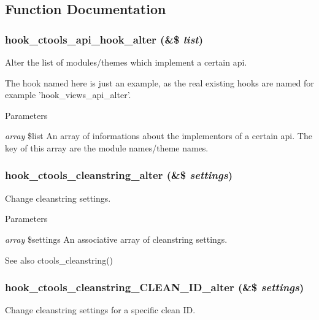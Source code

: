 \subsection{Function Documentation}
\hypertarget{group__hooks_gad31fa7973a09a182d52fc1bda3bd95a0}{
\subsubsection[{hook\_\-ctools\_\-api\_\-hook\_\-alter}]{\setlength{\rightskip}{0pt plus 5cm}hook\_\-ctools\_\-api\_\-hook\_\-alter (\&\$ {\em list})}}
\label{group__hooks_gad31fa7973a09a182d52fc1bda3bd95a0}
Alter the list of modules/themes which implement a certain api.

The hook named here is just an example, as the real existing hooks are named for example 'hook\_\-views\_\-api\_\-alter'.


\begin{DoxyParams}{Parameters}
\item[{\em array}]\$list An array of informations about the implementors of a certain api. The key of this array are the module names/theme names. \end{DoxyParams}
\hypertarget{group__hooks_ga8904abb33205b8553b560e08fd005e3a}{
\subsubsection[{hook\_\-ctools\_\-cleanstring\_\-alter}]{\setlength{\rightskip}{0pt plus 5cm}hook\_\-ctools\_\-cleanstring\_\-alter (\&\$ {\em settings})}}
\label{group__hooks_ga8904abb33205b8553b560e08fd005e3a}
Change cleanstring settings.


\begin{DoxyParams}{Parameters}
\item[{\em array}]\$settings An associative array of cleanstring settings.\end{DoxyParams}
\begin{DoxySeeAlso}{See also}
ctools\_\-cleanstring() 
\end{DoxySeeAlso}
\hypertarget{group__hooks_gaa77de664d1ef915311e4f768eb6c62ea}{
\subsubsection[{hook\_\-ctools\_\-cleanstring\_\-CLEAN\_\-ID\_\-alter}]{\setlength{\rightskip}{0pt plus 5cm}hook\_\-ctools\_\-cleanstring\_\-CLEAN\_\-ID\_\-alter (\&\$ {\em settings})}}
\label{group__hooks_gaa77de664d1ef915311e4f768eb6c62ea}
Change cleanstring settings for a specific clean ID.


